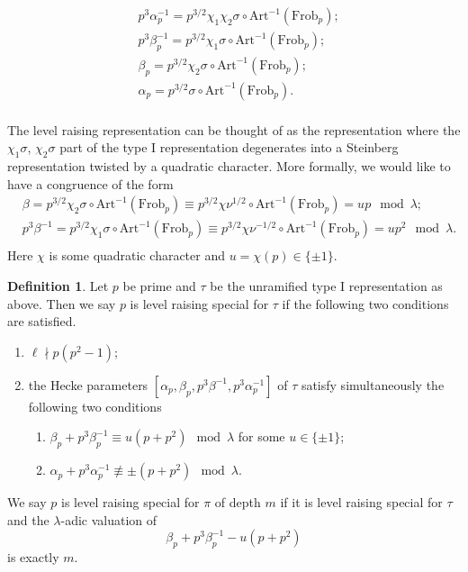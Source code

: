 \documentclass[10pt]{amsart}
\numberwithin{equation}{section}
\theoremstyle{definition}
\newtheorem{definition}[equation]{Definition}
\def\Frob{\mathrm{Frob}}
\def\rmI{\mathrm{I}}
\begin{document}
\begin{equation*}
\begin{aligned}
&p^{3}\alpha^{-1}_{p}=p^{3/2}\chi_{1}\chi_{2}\sigma\circ\mathrm{Art}^{-1}(\Frob_{p});\\
&p^{3}\beta^{-1}_{p}=p^{3/2}\chi_{1}\sigma\circ\mathrm{Art}^{-1}(\Frob_{p});\\
&\beta_{p}=p^{3/2}\chi_{2}\sigma\circ\mathrm{Art}^{-1}(\Frob_{p});\\
&\alpha_{p}=p^{3/2}\sigma\circ\mathrm{Art}^{-1}(\Frob_{p}).\\
\end{aligned}
\end{equation*}

The level raising representation can be thought of as the representation where the $\chi_{1}\sigma$, $\chi_{2}\sigma$ part of the type $\rmI$ representation degenerates into a Steinberg representation twisted by a quadratic character. More formally, we would like to have a congruence of the form
\begin{equation*}
\begin{aligned}
&\beta=p^{3/2}\chi_{2}\sigma\circ\mathrm{Art}^{-1}(\Frob_{p})\equiv p^{3/2}\chi\nu^{1/2}\circ\mathrm{Art}^{-1}(\Frob_{p})=u p \mod \lambda;\\
&p^{3}\beta^{-1}=p^{3/2}\chi_{1}\sigma\circ\mathrm{Art}^{-1}(\Frob_{p})\equiv p^{3/2}\chi\nu^{-1/2}\circ\mathrm{Art}^{-1}(\Frob_{p})=u p^{2} \mod \lambda.\\
\end{aligned}
\end{equation*}
Here $\chi$ is some quadratic character and $u=\chi(p)\in \{\pm1\}$.

\begin{definition}\label{level-raising-prime-local}
Let $p$ be prime and $\tau$ be the unramified type $\rmI$ representation as above. Then we say $p$ is level raising special for $\tau$ if the following two conditions are satisfied.
\begin{enumerate}
\item $\ell\nmid p(p^{2}-1)$;
\item the Hecke parameters $[\alpha_{p}, \beta_{p}, p^{3}\beta^{-1}, p^{3}\alpha^{-1}_{p}]$ of $\tau$ satisfy simultaneously the following two conditions
\begin{enumerate}
\item $\beta_{p}+p^{3}\beta^{-1}_{p}\equiv u (p+ p^{2})\mod \lambda$ for some $u\in\{\pm 1\}$;
\item $\alpha_{p}+p^{3}\alpha^{-1}_{p}\not\equiv \pm (p+ p^{2})\mod \lambda$.
\end{enumerate}
\end{enumerate}
We say $p$ is level raising special for $\pi$ of depth $m$ if it is level raising special for $\tau$ and the $\lambda$-adic valuation of
\begin{equation*}
\beta_{p}+p^{3}\beta^{-1}_{p}-u(p+ p^{2})
\end{equation*}
is exactly $m$.
\end{definition}
\end{document}
